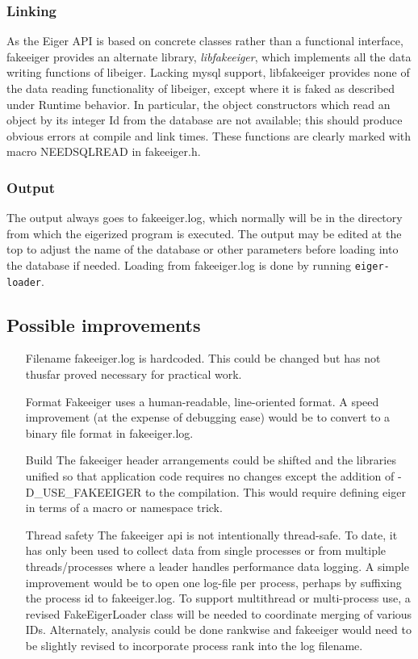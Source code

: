 \subsubsection{Linking} As the Eiger API is based on concrete classes rather than a functional interface, fakeeiger provides an alternate library, {\em libfakeeiger}, which implements all the data writing functions of libeiger. Lacking mysql support, libfakeeiger provides none of the data reading functionality of libeiger, except where it is faked as described under Runtime behavior. In particular, the object constructors which read an object by its integer Id from the database are not available; this should produce obvious errors at compile and link times. These functions are clearly marked with macro NEEDSQLREAD in fakeeiger.h.

\subsubsection{Output} The output always goes to fakeeiger.log, which normally will be in the directory from which the eigerized program is executed. The output may be edited at the top to adjust the name of the database or other parameters before loading into the database if needed. Loading from fakeeiger.log is done by running \texttt{eiger-loader}.



\subsection{Possible improvements}

\begin{itemize}
\item[Filename] fakeeiger.log is hardcoded. This could be changed but has not thusfar proved necessary for practical work.
\item[Format] Fakeeiger uses a human-readable, line-oriented format. A speed improvement (at the expense of debugging ease) would be to convert to a binary file format in fakeeiger.log.
\item[Build] The fakeeiger header arrangements could be shifted and the libraries unified so that application code requires no changes except the addition of -D\_USE\_FAKEEIGER to the compilation. This would require defining eiger in terms of a macro or namespace trick.
\item[Thread safety] The fakeeiger api is not intentionally thread-safe. To date, it has only been used to collect data from single processes or from multiple threads/processes where a leader handles performance data logging. A simple improvement would be to open one log-file per process, perhaps by suffixing the process id to fakeeiger.log. To support multithread or multi-process use, a revised FakeEigerLoader class will be needed to coordinate merging of various IDs. Alternately, analysis could be done rankwise and fakeeiger would need to be slightly revised to incorporate process rank into the log filename.
\end{itemize}
